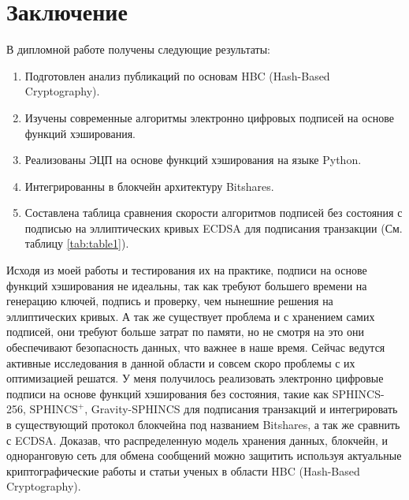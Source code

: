 \documentclass[a4paper, 14pt]{extarticle}
\begin{document}
\section{Заключение}
В дипломной работе получены следующие результаты:
\begin{enumerate}
    \item Подготовлен анализ публикаций по основам HBC (Hash-Based Cryptography).
    \item Изучены современные алгоритмы электронно цифровых подписей на основе функций хэширования.
    \item Реализованы ЭЦП на основе функций хэширования на языке Python.
    \item Интегрированны в блокчейн архитектуру Bitshares.
    \item Составлена таблица сравнения скорости алгоритмов подписей без состояния с подписью на эллиптических кривых ECDSA для подписания транзакции (См. таблицу \ref{tab:table1}).
\end{enumerate}

Исходя из моей работы и тестирования их на практике, подписи на основе функций хэширования не идеальны, так как требуют большего времени на генерацию ключей, подпись и проверку, чем нынешние решения на эллиптических кривых. А так же существует проблема и с хранением самих подписей, они требуют больше затрат по памяти, но не смотря на это они обеспечивают безопасность данных, что важнее в наше время. Сейчас ведутся активные исследования в данной области и совсем скоро проблемы с их оптимизацией решатся. У меня получилось реализовать электронно цифровые подписи на основе функций хэширования без состояния, такие как SPHINCS-256, $\text{SPHINCS}^+$, Gravity-SPHINCS для подписания транзакций и интегрировать в существующий протокол блокчейна под названием Bitshares, а так же сравнить с ECDSA. Доказав, что распределенную модель хранения данных, блокчейн, и одноранговую сеть для обмена сообщений можно защитить используя актуальные криптографические работы и статьи ученых в области HBC (Hash-Based Cryptography).
\newpage
\end{document}
